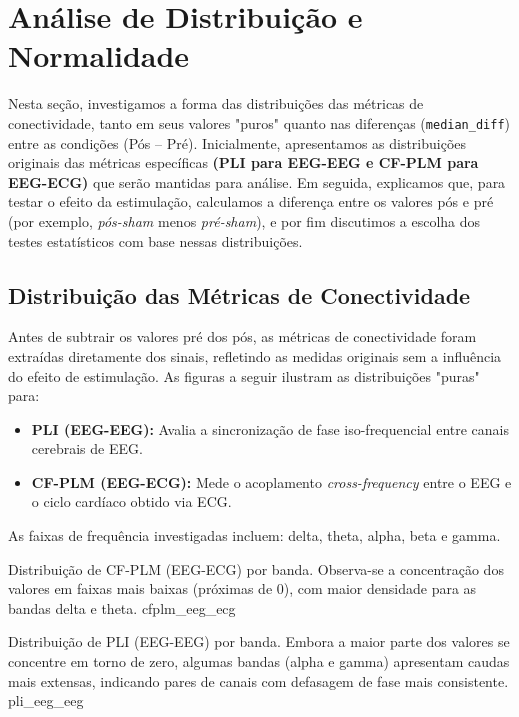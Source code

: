 \chapter{Análise de Distribuição e Normalidade}
\label{chap:analise_distribuicao_normalidade}

Nesta seção, investigamos a forma das distribuições das métricas de conectividade, tanto em seus valores "puros" quanto nas diferenças (\texttt{median\_diff}) entre as condições (Pós – Pré). Inicialmente, apresentamos as distribuições originais das métricas específicas \textbf{(PLI para EEG-EEG e CF-PLM para EEG-ECG)} que serão mantidas para análise. Em seguida, explicamos que, para testar o efeito da estimulação, calculamos a diferença entre os valores pós e pré (por exemplo, \emph{pós-sham} menos \emph{pré-sham}), e por fim discutimos a escolha dos testes estatísticos com base nessas distribuições.

\section{Distribuição das Métricas de Conectividade}

Antes de subtrair os valores pré dos pós, as métricas de conectividade foram extraídas diretamente dos sinais, refletindo as medidas originais sem a influência do efeito de estimulação. As figuras a seguir ilustram as distribuições "puras" para:

\begin{itemize}
    \item \textbf{PLI (EEG-EEG):} Avalia a sincronização de fase iso-frequencial entre canais cerebrais de EEG.
    \item \textbf{CF-PLM (EEG-ECG):} Mede o acoplamento \emph{cross-frequency} entre o EEG e o ciclo cardíaco obtido via ECG.
\end{itemize}

As faixas de frequência investigadas incluem: delta, theta, alpha, beta e gamma.

{Distribuição de CF-PLM (EEG-ECG) por banda. Observa-se a concentração dos valores em faixas mais baixas (próximas de 0), com maior densidade para as bandas delta e theta.}
{cfplm_eeg_ecg}

{Distribuição de PLI (EEG-EEG) por banda. Embora a maior parte dos valores se concentre em torno de zero, algumas bandas (alpha e gamma) apresentam caudas mais extensas, indicando pares de canais com defasagem de fase mais consistente.}
{pli_eeg_eeg}

